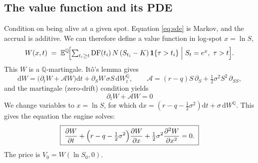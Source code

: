 \documentclass[11pt]{article}
\newcommand{\E}{\mathbb{E}}
\newcommand{\QQ}{\mathbb{Q}}
\newcommand{\dd}{\mathrm{d}}
\newcommand{\DF}{\mathrm{DF}}
\newcommand{\ind}[1]{\mathbf{1}\{#1\}}
\begin{document}
\subsection{The value function and its PDE}
Condition on being alive at a given spot. Equation \eqref{eq:sde} is Markov, and the accrual is
additive. We can therefore define a value function in log-spot $x=\ln S$,
\begin{equation}
  W(x,t) \;=\; \E^{\QQ}\!\Bigl[\textstyle\sum_{t_i\ge t}\DF(t_i)\,N\,(S_{t_i}-K)\,
  \ind{\tau>t_i}\;\Big|\; S_t=e^{x},\ \tau>t\Bigr].
  \label{eq:W}
\end{equation}
This $W$ is a $\QQ$-martingale. Itô's lemma gives
\begin{equation}
  \dd W = \bigl(\partial_t W + \mathcal A W\bigr)\dd t + \partial_S W\,\sigma S\,\dd W_t^{\QQ},
  \qquad
  \mathcal A = (r-q)S\,\partial_S + \tfrac12\sigma^2 S^2\,\partial_{SS},
\end{equation}
and the martingale (zero-drift) condition yields
\begin{equation}
  \partial_t W + \mathcal A W = 0
  \label{eq:pde-S}
\end{equation}
We change variables to $x=\ln S$, for which
$\dd x=(r-q-\tfrac12\sigma^2)\dd t+\sigma\,\dd W^{\QQ}$. This gives the equation the engine solves:
\begin{equation}
  \boxed{\;
  \frac{\partial W}{\partial t}
  + \Bigl(r-q-\tfrac12\sigma^2\Bigr)\frac{\partial W}{\partial x}
  + \tfrac12\sigma^2\frac{\partial^2 W}{\partial x^2} = 0.
  \;}
  \label{eq:pde-x}
\end{equation}
The price is $V_0=W(\ln S_0,0)$.
\end{document}
